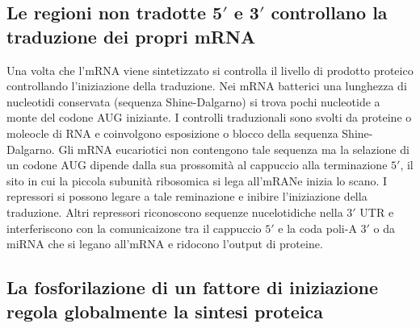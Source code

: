 \subsection{Le regioni non tradotte $\mathbf{5'}$ e $\mathbf{3'}$ controllano la traduzione dei propri mRNA}
Una volta che l'mRNA viene sintetizzato si controlla il livello di prodotto proteico controllando l'iniziazione della traduzione. Nei mRNA batterici una lunghezza di nucleotidi 
conservata (sequenza Shine-Dalgarno) si trova pochi nucleotide a monte del codone AUG iniziante. I controlli traduzionali sono svolti da proteine o moleocle di RNA e coinvolgono
esposizione o blocco della sequenza Shine-Dalgarno. Gli mRNA eucariotici non contengono tale sequenza ma la selazione di un codone AUG dipende dalla sua prossomit\`a al cappuccio alla
terminazione $5'$, il sito in cui la piccola subunit\`a ribosomica si lega all'mRANe inizia lo scano. I repressori si possono legare a tale reminazione e inibire l'iniziazione della
traduzione. Altri repressori riconoscono sequenze nucelotidiche nella $3'$ UTR e interferiscono con la comunicaizone tra il cappuccio $5'$ e la coda poli-A $3'$ o da miRNA che si legano
all'mRNA e ridocono l'output di proteine.
\subsection{La fosforilazione di un fattore di iniziazione regola globalmente la sintesi proteica}

